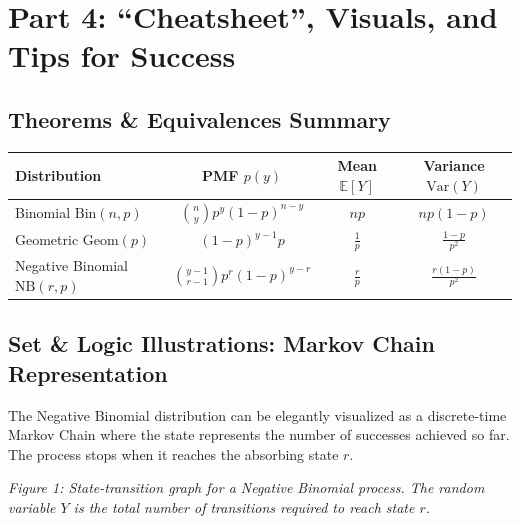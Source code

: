\documentclass[11pt, letterpaper]{article}
\theoremstyle{definition}
\theoremstyle{remark}
\newcommand{\E}{\mathbb{E}}
\newcommand{\Var}{\mathrm{Var}}
\begin{document}
\section{Part 4: ``Cheatsheet'', Visuals, and Tips for Success}

\subsection{Theorems \& Equivalences Summary}
\begin{center}
\renewcommand{\arraystretch}{1.5}
\begin{tabular}{|l|c|c|c|}
\hline
\textbf{Distribution} & \textbf{PMF $p(y)$} & \textbf{Mean $\E[Y]$} & \textbf{Variance $\Var(Y)$} \\
\hline
Binomial $\mathrm{Bin}(n,p)$ & $\binom{n}{y} p^y (1-p)^{n-y}$ & $np$ & $np(1-p)$ \\
Geometric $\mathrm{Geom}(p)$ & $(1-p)^{y-1} p$ & $\frac{1}{p}$ & $\frac{1-p}{p^2}$ \\
Negative Binomial $\mathrm{NB}(r,p)$ & $\binom{y-1}{r-1} p^r (1-p)^{y-r}$ & $\frac{r}{p}$ & $\frac{r(1-p)}{p^2}$ \\
\hline
\end{tabular}
\end{center}

\subsection{Set \& Logic Illustrations: Markov Chain Representation}
The Negative Binomial distribution can be elegantly visualized as a discrete-time Markov Chain where the state represents the number of successes achieved so far. The process stops when it reaches the absorbing state $r$.

\begin{center}
\end{center}
\textit{Figure 1: State-transition graph for a Negative Binomial process. The random variable $Y$ is the total number of transitions required to reach state $r$.}
\end{document}
